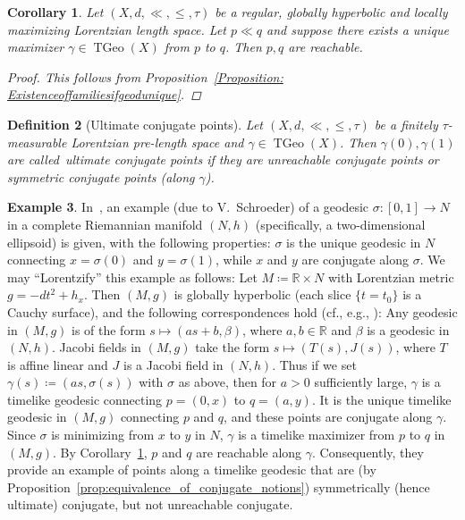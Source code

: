 \documentclass[a4paper,11pt]{article}
\numberwithin{equation}{section}
\theoremstyle{plain}
\newtheorem{Definition}{Definition}[section]
\newtheorem{Corollary}[Definition]{Corollary}
\theoremstyle{definition}
\newtheorem{Example}[Definition]{Example}
\newcommand{\R}{\mathbb R}
\DeclareMathOperator{\TGeo}{TGeo}
\begin{document}
\begin{Corollary}\label{cor:unique-max-reachable}
    Let $(X,d,\ll,\leq,\tau)$ be a regular, globally hyperbolic and locally maximizing Lorentzian length space. Let $p \ll q$ and suppose there exists a unique maximizer $\gamma \in \TGeo(X)$ from $p$ to $q$. Then $p,q$ are reachable.
\begin{proof}
    This follows from Proposition~\ref{Proposition: Existenceoffamiliesifgeodunique}.
\end{proof}
\end{Corollary}

\begin{Definition}[Ultimate conjugate points]
Let $(X,d,\ll,\leq,\tau)$ be a finitely $\tau$-measurable Lorentzian pre-length space and $\gamma \in \TGeo(X)$. Then $\gamma(0),\gamma(1)$ are called~\emph{ultimate conjugate points\/} if they are unreachable conjugate points or symmetric conjugate points (along $\gamma$).
\end{Definition}

\begin{Example} In~\cite[Ex.\ 4.7]{shankar2009conjugate}, an example (due to V.\ Schroeder) of a geodesic $\sigma \colon [0,1] \to N$ in a
complete Riemannian manifold $(N,h)$ (specifically, a two-dimensional ellipsoid) is given, with the following properties: $\sigma$ is the unique geodesic in $N$ connecting $x=\sigma(0)$ and $y=\sigma(1)$, while $x$ and $y$ are conjugate along $\sigma$. We may ``Lorentzify'' this example as follows: Let $M \coloneqq \R\times N$ with Lorentzian metric $g=-dt^2 + h_x$. Then $(M,g)$ is globally hyperbolic (each slice $\{t=t_0\}$ is a Cauchy surface), and the following correspondences hold (cf., e.g., \cite[Ch.\ 7]{ON83}): Any geodesic in $(M,g)$ is of the form $s\mapsto (as+b,\beta)$, where $a,b\in \R$ and $\beta$ is a geodesic in $(N,h)$. Jacobi fields in $(M,g)$ take the form $s\mapsto (T(s),J(s))$, where $T$ is affine linear and $J$ is a Jacobi field in $(N,h)$. Thus if we set $\gamma(s) \coloneqq (as,\sigma(s))$ with $\sigma$ as above, then for $a>0$ sufficiently large, $\gamma$ is a timelike geodesic connecting $p=(0,x)$ to $q=(a,y)$. It is the unique timelike geodesic in $(M,g)$ connecting $p$ and $q$, and these points are conjugate along $\gamma$. Since $\sigma$ is minimizing from $x$ to $y$ in $N$, $\gamma$ is a timelike maximizer from $p$ to $q$ in $(M,g)$. By Corollary~\ref{cor:unique-max-reachable}, $p$ and $q$ are reachable along $\gamma$. Consequently, they provide an example of points along a timelike geodesic that are (by Proposition~\ref{prop:equivalence_of_conjugate_notions}) symmetrically (hence ultimate) conjugate, but not unreachable conjugate.
\end{Example}
\end{document}
